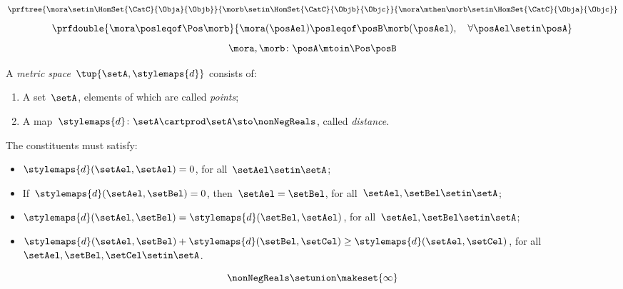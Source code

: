 {\begin{forslides}
\begin{equation}
            \label{eq:poset_bool_m}
            \prftree{\mora \setin \HomSet{\CatC}{\Obja}{\Objb}}{\morb \setin \HomSet{\CatC}{\Objb}{\Objc}}{{\mora\mthen \morb \setin \HomSet{\CatC}{\Obja}{\Objc}}}
        \end{equation}
        \begin{equation}
            \label{eq:poset_pos_a}
            \prfdouble{
                \mora \posleqof\Pos \morb}{\mora(\posAel)\posleqof\posB \morb(\posAel), \quad \forall \posAel \setin \posA}
        \end{equation}
        \begin{equation}
            \label{eq:poset_pos_b}
            \mora,\morb\colon \posA\mtoin\Pos \posB
        \end{equation}
        \begin{definition}
            \label{def:metric_space}
            A \emph{metric space}~$\tup{\setA,\stylemaps{d}}$ consists of:
            \begin{enumerate}
                \item A set~$\setA$, elements of which are called \emph{points};
                \item A map~$\stylemaps{d}\colon \setA\cartprod \setA \sto \nonNegReals$, called \emph{distance}.
            \end{enumerate}
            The constituents must satisfy:
            \begin{itemize}
                \item $\stylemaps{d}(\setAel,\setAel)=0$, for all~$\setAel\setin \setA$;
                \item If~$\stylemaps{d}(\setAel, \setBel)=0$, then~$\setAel=\setBel$, for all~$\setAel,\setBel\setin \setA$;
                \item $\stylemaps{d}(\setAel, \setBel)=\stylemaps{d}(\setBel, \setAel)$, for all~$\setAel,\setBel\setin \setA$;
                \item $\stylemaps{d}(\setAel, \setBel)+\stylemaps{d}(\setBel, \setCel)\geq \stylemaps{d}(\setAel, \setCel)$, for all~$\setAel,\setBel,\setCel\setin \setA$.
            \end{itemize}
        \end{definition}
        \begin{equation}
            \label{eq:r_with_inft}
            \nonNegReals \setunion \makeset{\infty}
        \end{equation}
        \begin{equation}
            \label{eq:cost_cat}

\end{equation}
\end{forslides}}
